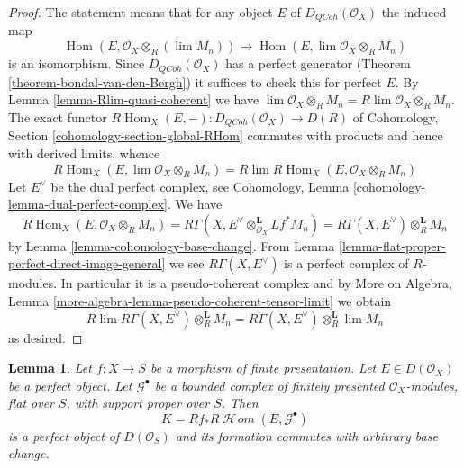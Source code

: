 \documentclass{stacks-project}
\theoremstyle{plain}
\newtheorem{lemma}[subsection]{Lemma}
\theoremstyle{definition}
\theoremstyle{remark}
\numberwithin{equation}{subsection}
\def\lim{\mathop{\mathrm{lim}}\nolimits}
\def\Hom{\mathop{\mathrm{Hom}}\nolimits}
\def\SheafHom{\mathop{\mathcal{H}\!\mathit{om}}\nolimits}
\def\QCoh{\mathit{QCoh}}
\begin{document}
\begin{proof}
The statement means that for any object $E$ of
$D_\QCoh(\mathcal{O}_X)$ the induced map
$$
\Hom(E, \mathcal{O}_X \otimes_R (\lim M_n))
\longrightarrow
\Hom(E, \lim \mathcal{O}_X \otimes_R M_n)
$$
is an isomorphism. Since $D_\QCoh(\mathcal{O}_X)$ has
a perfect generator (Theorem \ref{theorem-bondal-van-den-Bergh})
it suffices to check this for perfect $E$.
By Lemma \ref{lemma-Rlim-quasi-coherent} we have
$\lim \mathcal{O}_X \otimes_R M_n = R\lim \mathcal{O}_X \otimes_R M_n$.
The exact functor
$R\Hom_X(E, -) : D_\QCoh(\mathcal{O}_X) \to D(R)$
of Cohomology, Section \ref{cohomology-section-global-RHom}
commutes with products and hence with derived limits, whence
$$
R\Hom_X(E, \lim \mathcal{O}_X \otimes_R M_n) =
R\lim R\Hom_X(E, \mathcal{O}_X \otimes_R M_n)
$$
Let $E^\vee$ be the dual perfect complex, see
Cohomology, Lemma \ref{cohomology-lemma-dual-perfect-complex}.
We have
$$
R\Hom_X(E, \mathcal{O}_X \otimes_R M_n) =
R\Gamma(X, E^\vee \otimes_{\mathcal{O}_X}^\mathbf{L} Lf^*M_n) =
R\Gamma(X, E^\vee) \otimes_R^\mathbf{L} M_n
$$
by Lemma \ref{lemma-cohomology-base-change}.
From Lemma \ref{lemma-flat-proper-perfect-direct-image-general}
we see $R\Gamma(X, E^\vee)$ is a perfect complex of $R$-modules.
In particular it is a pseudo-coherent complex and by
More on Algebra, Lemma \ref{more-algebra-lemma-pseudo-coherent-tensor-limit}
we obtain
$$
R\lim R\Gamma(X, E^\vee) \otimes_R^\mathbf{L} M_n =
R\Gamma(X, E^\vee) \otimes_R^\mathbf{L} \lim M_n
$$
as desired.
\end{proof}

\begin{lemma}
\label{lemma-base-change-RHom-perfect}
Let $f : X \to S$ be a morphism of finite presentation.
Let $E \in D(\mathcal{O}_X)$ be a perfect object. Let $\mathcal{G}^\bullet$
be a bounded complex of finitely presented $\mathcal{O}_X$-modules,
flat over $S$, with support proper over $S$. Then
$$
K = Rf_*R\SheafHom(E, \mathcal{G}^\bullet)
$$
is a perfect object of $D(\mathcal{O}_S)$ and its formation
commutes with arbitrary base change.
\end{lemma}
\end{document}
